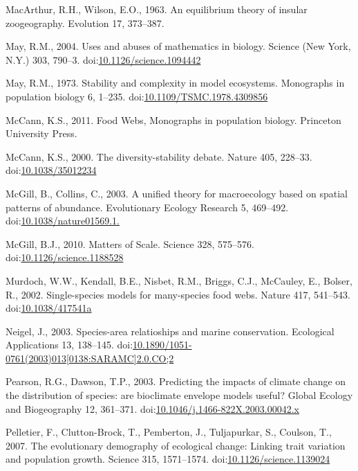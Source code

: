 \hypertarget{ref-MacArthur1963}{}
MacArthur, R.H., Wilson, E.O., 1963. An equilibrium theory of insular
zoogeography. Evolution 17, 373--387.

\hypertarget{ref-May2004}{}
May, R.M., 2004. Uses and abuses of mathematics in biology. Science (New
York, N.Y.) 303, 790--3.
doi:\href{https://doi.org/10.1126/science.1094442}{10.1126/science.1094442}

\hypertarget{ref-May1973}{}
May, R.M., 1973. Stability and complexity in model ecosystems.
Monographs in population biology 6, 1--235.
doi:\href{https://doi.org/10.1109/TSMC.1978.4309856}{10.1109/TSMC.1978.4309856}

\hypertarget{ref-mccann2011food}{}
McCann, K.S., 2011. Food Webs, Monographs in population biology.
Princeton University Press.

\hypertarget{ref-McCann2000}{}
McCann, K.S., 2000. The diversity-stability debate. Nature 405, 228--33.
doi:\href{https://doi.org/10.1038/35012234}{10.1038/35012234}

\hypertarget{ref-McGill2003}{}
McGill, B., Collins, C., 2003. A unified theory for macroecology based
on spatial patterns of abundance. Evolutionary Ecology Research 5,
469--492.
doi:\href{https://doi.org/10.1038/nature01569.1.}{10.1038/nature01569.1.}

\hypertarget{ref-McGill2010}{}
McGill, B.J., 2010. Matters of Scale. Science 328, 575--576.
doi:\href{https://doi.org/10.1126/science.1188528}{10.1126/science.1188528}

\hypertarget{ref-Murdoch2002}{}
Murdoch, W.W., Kendall, B.E., Nisbet, R.M., Briggs, C.J., McCauley, E.,
Bolser, R., 2002. Single-species models for many-species food webs.
Nature 417, 541--543.
doi:\href{https://doi.org/10.1038/417541a}{10.1038/417541a}

\hypertarget{ref-Neigel2003}{}
Neigel, J., 2003. Species-area relatioships and marine conservation.
Ecological Applications 13, 138--145.
doi:\href{https://doi.org/10.1890/1051-0761(2003)013\%5B0138:SARAMC\%5D2.0.CO;2}{10.1890/1051-0761(2003)013{[}0138:SARAMC{]}2.0.CO;2}

\hypertarget{ref-Pearson2003}{}
Pearson, R.G., Dawson, T.P., 2003. Predicting the impacts of climate
change on the distribution of species: are bioclimate envelope models
useful? Global Ecology and Biogeography 12, 361--371.
doi:\href{https://doi.org/10.1046/j.1466-822X.2003.00042.x}{10.1046/j.1466-822X.2003.00042.x}

\hypertarget{ref-Pelletier2007}{}
Pelletier, F., Clutton-Brock, T., Pemberton, J., Tuljapurkar, S.,
Coulson, T., 2007. The evolutionary demography of ecological change:
Linking trait variation and population growth. Science 315, 1571--1574.
doi:\href{https://doi.org/10.1126/science.1139024}{10.1126/science.1139024}

